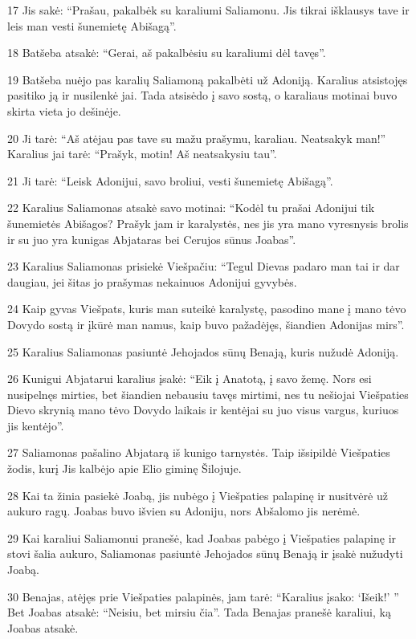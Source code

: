 \par 17 Jis sakė: “Prašau, pakalbėk su karaliumi Saliamonu. Jis tikrai išklausys tave ir leis man vesti šunemietę Abišagą”. 
\par 18 Batšeba atsakė: “Gerai, aš pakalbėsiu su karaliumi dėl tavęs”. 
\par 19 Batšeba nuėjo pas karalių Saliamoną pakalbėti už Adoniją. Karalius atsistojęs pasitiko ją ir nusilenkė jai. Tada atsisėdo į savo sostą, o karaliaus motinai buvo skirta vieta jo dešinėje. 
\par 20 Ji tarė: “Aš atėjau pas tave su mažu prašymu, karaliau. Neatsakyk man!” Karalius jai tarė: “Prašyk, motin! Aš neatsakysiu tau”. 
\par 21 Ji tarė: “Leisk Adonijui, savo broliui, vesti šunemietę Abišagą”. 
\par 22 Karalius Saliamonas atsakė savo motinai: “Kodėl tu prašai Adonijui tik šunemietės Abišagos? Prašyk jam ir karalystės, nes jis yra mano vyresnysis brolis ir su juo yra kunigas Abjataras bei Cerujos sūnus Joabas”. 
\par 23 Karalius Saliamonas prisiekė Viešpačiu: “Tegul Dievas padaro man tai ir dar daugiau, jei šitas jo prašymas nekainuos Adonijui gyvybės. 
\par 24 Kaip gyvas Viešpats, kuris man suteikė karalystę, pasodino mane į mano tėvo Dovydo sostą ir įkūrė man namus, kaip buvo pažadėjęs, šiandien Adonijas mirs”. 
\par 25 Karalius Saliamonas pasiuntė Jehojados sūnų Benają, kuris nužudė Adoniją. 
\par 26 Kunigui Abjatarui karalius įsakė: “Eik į Anatotą, į savo žemę. Nors esi nusipelnęs mirties, bet šiandien nebausiu tavęs mirtimi, nes tu nešiojai Viešpaties Dievo skrynią mano tėvo Dovydo laikais ir kentėjai su juo visus vargus, kuriuos jis kentėjo”. 
\par 27 Saliamonas pašalino Abjatarą iš kunigo tarnystės. Taip išsipildė Viešpaties žodis, kurį Jis kalbėjo apie Elio giminę Šilojuje. 
\par 28 Kai ta žinia pasiekė Joabą, jis nubėgo į Viešpaties palapinę ir nusitvėrė už aukuro ragų. Joabas buvo išvien su Adoniju, nors Abšalomo jis nerėmė. 
\par 29 Kai karaliui Saliamonui pranešė, kad Joabas pabėgo į Viešpaties palapinę ir stovi šalia aukuro, Saliamonas pasiuntė Jehojados sūnų Benają ir įsakė nužudyti Joabą. 
\par 30 Benajas, atėjęs prie Viešpaties palapinės, jam tarė: “Karalius įsako: ‘Išeik!’ ” Bet Joabas atsakė: “Neisiu, bet mirsiu čia”. Tada Benajas pranešė karaliui, ką Joabas atsakė. 
